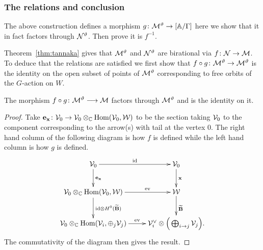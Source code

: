 \documentclass{amsart}
\theoremstyle{definition}
\begin{document}

\subsubsection{The relations and conclusion}

The above construction defines a morphism $g \colon \mathcal{M}^\vartheta \rightarrow [\mathbb{A}/\Gamma]$ here we show that it in fact factors through $\mathcal{N}^\vartheta$.
Then prove it is $f^{-1}$.

Theorem~\ref{thm:tannaka} gives that $\mathcal{M}^\vartheta$ and $\mathcal{N}^\vartheta$ are birational via $f \colon \mathcal{N} \rightarrow \mathcal{M}$.
To deduce that the relations are satisfied we first show that $f \circ g \colon \mathcal{M}^\vartheta \rightarrow \mathcal{M}^\vartheta$ is the identity on the open subset of points of $\mathcal{M}^\vartheta$ corresponding to free orbits of the $G$-action on $W$.

\begin{theorem}\label{thm:fg}
The morphism $f \circ g \colon \mathcal{M}^{\vartheta} \longrightarrow \mathcal{M}$ factors through $\mathcal{M}^\vartheta$ and is the identity on it.
\end{theorem}

\begin{proof}
Take $\mathbf{e}_{\mathbf{x}} \colon \mathcal{V}_0 \rightarrow \mathcal{V}_0 \otimes_{\mathbb{C}} \operatorname{Hom}(\mathcal{V}_0, \mathcal{W})$ to be the section taking $\mathcal{V}_0$ to the component corresponding to the arrow(s) with tail at the vertex $0$.
The right hand column of the following diagram is how $f$ is defined while the left hand column is how $g$ is defined.
\begin{equation}\label{eq:gf}
    \xymatrix{\cV_0 \ar[r]^{\text{id}} \ar[d]^{\bfe_\bfx} & \cV_0 \ar[d]^\bfx \\
    \cV_0 \otimes_\bC \Hom(\cV_0, \cW) \ar[r]^-{\text{ev}} \ar[d]^{\text{id} \otimes H^0({\widetilde{\bfB}})} & \cW \ar[d]^{\widetilde{\bfB}} \\
    \cV_0 \otimes_\bC \Hom(\cV_i, \oplus_j \cV_j) \ar[r]^-{\text{ev}} & \cV_i^\vee \otimes \Big(\bigoplus_{i \rightarrow j}\cV_j\Big).
    }
\end{equation}
The commutativity of the diagram then gives the result.
\end{proof}
\end{document}

